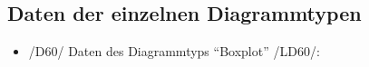 \subsection{Daten der einzelnen Diagrammtypen}
\label{subsec:daten-diagrammtypen}

\begin{itemize}
	\item /D60/ Daten des Diagrammtyps "`Boxplot"' /LD60/:
\end{itemize}
